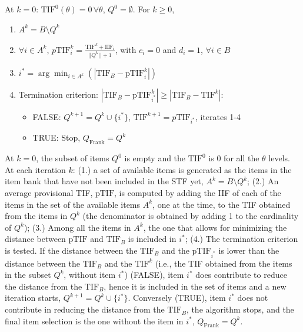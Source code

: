 \documentclass{svproc}
\begin{document}
At $k = 0$: $\text{TIF}^0(\theta) = 0 \, \forall \theta$, $Q^0 = \emptyset$. For $k \geq 0$,

\begin{enumerate}
	\item  $A^k = B \setminus Q^k$ 
	\item $\forall i \in A^k$, $p\text{TIF}_{i}^k = \frac{\text{TIF}^k + \text{IIF}_{i}}{||Q^k||+1}$, with $c_i = 0$ and $d_i = 1$, $\forall i \in B$
	\item $i^* = \arg \min_{i \in A^k} (|\text{TIF}_B - \text{pTIF}_i^k|)$
	\item Termination criterion: $|\text{TIF}_B - \text{pTIF}_{i^*}^k| \geq |\text{TIF}_B - \text{TIF}^{k}|$: 
	\begin{itemize}
		\item FALSE:  $Q^{k+1} = Q^{k} \cup \{i^*\}$, $\text{TIF}^{k+1} = p\text{TIF}_{i^*}$, iterates 1-4 
		\item TRUE: Stop, %
		$Q_{\text{Frank}} = Q^k$
		
	\end{itemize}
\end{enumerate}
At $k = 0$, the subset of items $Q^0$ is empty and the $\text{TIF}^0$ is 0 for all the $\theta$ levels. 
At each iteration $k$: (1.) a set of available items is generated as the items in the item bank that have not been included in the STF yet, $A^k = B \setminus Q^k$; (2.)
An average provisional TIF, $\text{pTIF}$, is computed by adding the IIF of each of the items in the set of the available items $A^k$, one at the time, to the TIF obtained from the items in $Q^k$ (the denominator is obtained by adding 1 to the cardinality of $Q^k$); (3.) Among all the items in $A^k$, the one that allows for minimizing the distance between $\text{pTIF}$ and $\text{TIF}_B$ is included in $i^*$; (4.) 
The termination criterion is tested. 
If the distance between the $\text{TIF}_B$ and the $\text{pTIF}_{i^*}$ is lower than the distance between the $\text{TIF}_B$ and the $\text{TIF}^k$  (i.e., the TIF obtained from the items in the subset $Q^k$, without item $i^*$) (FALSE), item $i^*$ does contribute to reduce the distance from the $\text{TIF}_B$, hence it is included in the set of items and a new iteration starts, $Q^{k+1} = Q^k \cup \{i^*\}$.
Conversely (TRUE), item $i^*$ does not contribute in reducing the distance from the $\text{TIF}_B$, the algorithm stops, and the final item selection is the one without the item in $i^*$, $Q_{\text{Frank}} = Q^k$.
\end{document}
